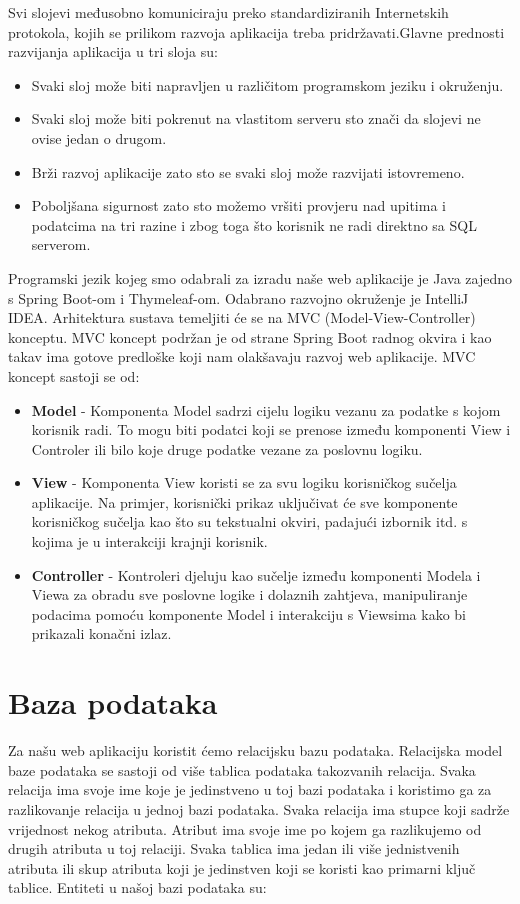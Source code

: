 Svi slojevi međusobno komuniciraju preko standardiziranih Internetskih protokola, kojih se prilikom razvoja 
aplikacija treba pridržavati.Glavne prednosti razvijanja aplikacija u tri sloja su:
\begin{itemize}
	\item Svaki sloj može biti napravljen u različitom programskom jeziku i okruženju.
	\item Svaki sloj može biti pokrenut na vlastitom serveru sto znači da slojevi ne ovise jedan o drugom.
	\item Brži razvoj aplikacije zato sto se svaki sloj može razvijati istovremeno.
	\item Poboljšana sigurnost zato sto možemo vršiti provjeru nad upitima i podatcima na tri razine i zbog toga što korisnik ne radi direktno sa SQL serverom.
\end{itemize}
Programski jezik kojeg smo odabrali za izradu naše web aplikacije je Java zajedno s Spring Boot-om i Thymeleaf-om. 
Odabrano razvojno okruženje je IntelliJ IDEA. Arhitektura sustava temeljiti  će se na MVC 
(Model-View-Controller) konceptu. MVC koncept podržan je od strane Spring Boot radnog okvira i kao takav ima gotove predloške koji nam olakšavaju razvoj web aplikacije.
MVC koncept sastoji se od:
\begin{itemize}
	\item \textbf{Model} - Komponenta Model sadrzi cijelu logiku vezanu za podatke s kojom korisnik radi. To mogu biti podatci koji se prenose između komponenti View i Controler ili bilo koje druge podatke vezane za poslovnu logiku.
	\item \textbf{View} - Komponenta View koristi se za svu logiku korisničkog sučelja aplikacije.  Na primjer, korisnički prikaz uključivat će sve komponente korisničkog sučelja kao što su tekstualni okviri, padajući izbornik itd. s kojima je u interakciji krajnji korisnik.
	\item \textbf{Controller} - Kontroleri djeluju kao sučelje između komponenti Modela i Viewa za obradu sve poslovne logike i dolaznih zahtjeva, manipuliranje podacima pomoću komponente Model i interakciju s Viewsima kako bi prikazali konačni izlaz.
\end{itemize} 
\eject


\section{Baza podataka}


Za našu web aplikaciju koristit ćemo relacijsku bazu podataka. Relacijska model baze podataka se sastoji od više tablica podataka takozvanih relacija. Svaka relacija ima svoje ime koje je jedinstveno u toj bazi podataka i koristimo ga za razlikovanje relacija u jednoj bazi podataka. Svaka relacija ima stupce koji sadrže vrijednost nekog atributa. Atribut ima svoje ime po kojem ga razlikujemo od drugih atributa u toj relaciji. Svaka tablica ima jedan ili više jednistvenih atributa ili skup atributa koji je jedinstven koji se koristi kao primarni ključ tablice. Entiteti u našoj bazi podataka su:

